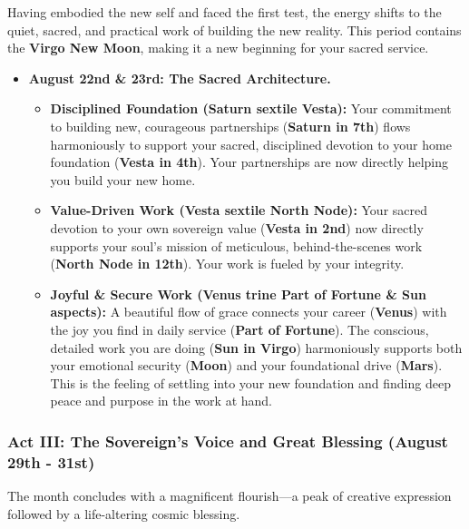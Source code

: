 \documentclass{article}
\begin{document}
Having embodied the new self and faced the first test, the energy shifts to the quiet, sacred, and practical work of building the new reality. This period contains the \textbf{Virgo New Moon}, making it a new beginning for your sacred service.

\begin{itemize}
\tightlist
\item
  \textbf{August 22nd \& 23rd: The Sacred Architecture.}

  \begin{itemize}
  \tightlist
  \item
    \textbf{Disciplined Foundation (Saturn sextile Vesta):} Your commitment to building new, courageous partnerships (\textbf{Saturn in 7th}) flows harmoniously to support your sacred, disciplined devotion to your home foundation (\textbf{Vesta in 4th}). Your partnerships are now directly helping you build your new home.
  \item
    \textbf{Value-Driven Work (Vesta sextile North Node):} Your sacred devotion to your own sovereign value (\textbf{Vesta in 2nd}) now directly supports your soul's mission of meticulous, behind-the-scenes work (\textbf{North Node in 12th}). Your work is fueled by your integrity.
  \item
    \textbf{Joyful \& Secure Work (Venus trine Part of Fortune \& Sun aspects):} A beautiful flow of grace connects your career (\textbf{Venus}) with the joy you find in daily service (\textbf{Part of Fortune}). The conscious, detailed work you are doing (\textbf{Sun in Virgo}) harmoniously supports both your emotional security (\textbf{Moon}) and your foundational drive (\textbf{Mars}). This is the feeling of settling into your new foundation and finding deep peace and purpose in the work at hand.
  \end{itemize}
\end{itemize}

\subsubsection*{Act III: The Sovereign's Voice and Great Blessing (August 29th - 31st)}\label{act-iii-the-sovereigns-voice-and-great-blessing-august-29th---31st}

The month concludes with a magnificent flourish---a peak of creative expression followed by a life-altering cosmic blessing.
\end{document}
